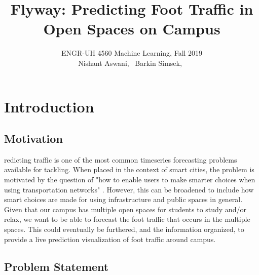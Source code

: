 \documentclass[journal, 12pt]{IEEEtran}
\begin{document}
{}
\setcounter{page}{1}

\title{\LARGE{Flyway: Predicting Foot Traffic in Open Spaces on Campus}}

\author{ ENGR-UH 4560 Machine Learning, Fall 2019\\
\medskip
Nishant Aswani,~
Barkin Simsek,~}%


%
{}

\maketitle




\section{Introduction}
\subsection{Motivation}
\lowercase{redicting} traffic is one of the most common timeseries forecasting problems available for tackling. When placed in the context of smart cities, the problem is motivated by the question of "how to enable users to make smarter choices when using transportation networks" \cite{lv2014traffic}. However, this can be broadened to include how smart choices are made for using infrastructure and public spaces in general. \\

\noindent Given that our campus has multiple open spaces for students to study and/or relax, we want to be able to forecast the foot traffic that occurs in the multiple spaces. This could eventually be furthered, and the information organized, to provide a live prediction visualization of foot traffic around campus.

\subsection{Problem Statement}
\end{document}
